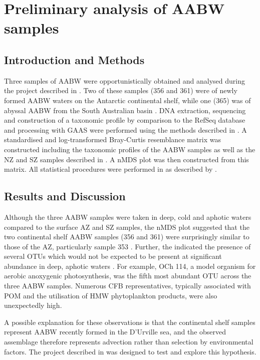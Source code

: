 \chapter{Preliminary analysis of \ac{AABW} samples}
\label{ch:deepappendix}

\section{Introduction and Methods}


Three samples of \ac{AABW} were opportunistically obtained and analysed during the project described in  .
Two of these samples (356 and 361) were of newly formed \ac{AABW} waters on the Antarctic continental shelf, while one (365) was of abyssal \ac{AABW} from the South Australian basin .
DNA extraction, sequencing and construction of a taxonomic profile by  comparison to the RefSeq database and processing with \ac{GAAS} were performed using the methods described in .
A standardised and log-transformed Bray-Curtis resemblance matrix was constructed including the taxonomic profiles of the \ac{AABW} samples as well as the \ac{NZ} and \ac{SZ} samples described in .
A \ac{nMDS} plot was then constructed from this matrix.
All statistical procedures were performed in  as described by \citet{Clarke:2001ut}.

\section{Results and Discussion}

Although the three \ac{AABW} samples were taken in deep, cold and aphotic waters  compared to the surface \ac{AZ} and \ac{SZ} samples, the \ac{nMDS} plot suggested that the two continental shelf \ac{AABW} samples (356 and 361) were surprisingly similar to those of the \ac{AZ}, particularly sample 353 .
Further, the indicated the presence of several \acp{OTU} which would not be expected to be present at significant abundance in deep, aphotic waters .
For example,  OCh 114, a model organism for aerobic anoxygenic photosynthesis, was the fifth most abundant \ac{OTU} across the three \ac{AABW} samples.
Numerous \ac{CFB} representatives, typically associated with \ac{POM} and the utilisation of \ac{HMW} phytoplankton products, were also unexpectedly high.



A possible explanation for these observations is that the continental shelf samples represent \ac{AABW} recently formed in the D'Urville sea, and the observed assemblage therefore represents advection rather than selection by environmental factors.
The project described in  was designed to test and explore this hypothesis.


